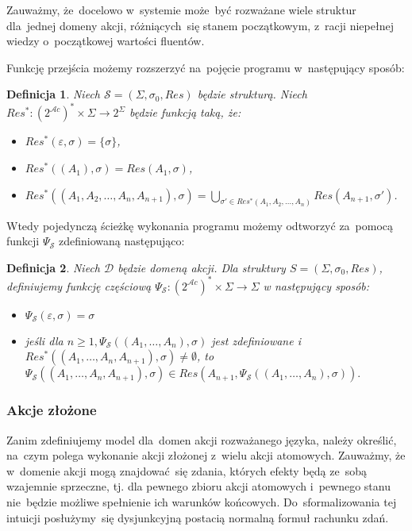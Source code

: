 \documentclass[11pt,a4paper]{article}
\newtheorem{defn}{Definicja}
\begin{document}
Zauważmy, że~docelowo w~systemie może~być rozważane wiele struktur dla~jednej domeny akcji, różniących~się stanem początkowym, z~racji niepełnej wiedzy o~początkowej wartości fluentów.

Funkcję przejścia możemy rozszerzyć na~pojęcie programu w~następujący sposób:

\begin{defn}
    Niech $\mathcal{S} = (\Sigma, \sigma_0, Res)$ będzie strukturą.
    Niech $Res^* : (2^{\mathcal{A}c})^* \times \Sigma \to 2^\Sigma$ będzie funkcją taką, że:
    \begin{itemize}
        \item $Res^*(\varepsilon, \sigma) = \{ \sigma \}$,
        \item $Res^*((A_1), \sigma) = Res(A_1, \sigma)$,
        \item $Res^*((A_1,A_2,\dots,A_n,A_{n+1}), \sigma) = \bigcup_{\sigma' \in Res^*(A_1,A_2,\dots,A_n)} Res(A_{n+1}, \sigma')$.
    \end{itemize}
\end{defn}

Wtedy pojedynczą ścieżkę wykonania programu możemy odtworzyć za~pomocą funkcji $\Psi_{\mathcal{S}}$ zdefiniowaną następująco:

\begin{defn}
    Niech $\mathcal{D}$ będzie domeną akcji. Dla struktury $S = (\Sigma,\sigma_0,Res)$, definiujemy funkcję częściową 
    $\Psi_{\mathcal{S}} : (2^{\mathcal{A}c})^* \times \Sigma \rightarrow \Sigma$ w następujący sposób:
    \begin{itemize}
    \item $\Psi_{\mathcal{S}}(\varepsilon,\sigma) = \sigma$
    \item jeśli dla $n \geq 1, \Psi_{\mathcal{S}}((A_1,\dots,A_n),\sigma)$ jest zdefiniowane i $Res^*((A_1,\dots,A_n,A_{n+1}),\sigma) \neq \emptyset$, to~$\Psi_{\mathcal{S}}((A_1,\dots,A_n,A_{n+1}),\sigma) \in Res(A_{n+1},\Psi_{\mathcal{S}}((A_1,\dots,A_n),\sigma)).$
    \end{itemize}
\end{defn}

\subsubsection{Akcje złożone}

Zanim zdefiniujemy model dla~domen akcji rozważanego języka, należy określić, na~czym polega wykonanie akcji złożonej z~wielu akcji atomowych.
Zauważmy, że w~domenie akcji mogą znajdować~się zdania, których efekty będą ze~sobą wzajemnie sprzeczne, tj. dla pewnego zbioru akcji atomowych i~pewnego stanu nie~będzie możliwe spełnienie ich warunków końcowych.
Do~sformalizowania tej intuicji posłużymy~się dysjunkcyjną postacią normalną formuł rachunku zdań.
\end{document}
